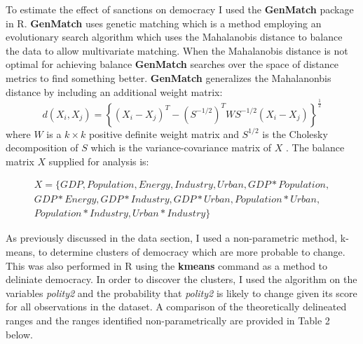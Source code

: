 \documentclass[a4paper]{article}\usepackage[]{graphicx}\usepackage[]{color}
\begin{document}
\par
To estimate the effect of sanctions on democracy I used the \textbf{GenMatch} package in R. \textbf{GenMatch} uses genetic matching which is a method employing an evolutionary search algorithm which uses the Mahalanobis distance to balance the data to allow multivariate matching\citep{diamond2013genetic}. When the Mahalanobis distance is not optimal for achieving balance \textbf{GenMatch} searches over the space of distance metrics to find something better. \textbf{GenMatch} generalizes the Mahalanonbis distance by including an additional weight matrix:
\[
d(X_i, X_j) = \left\{ (X_i - X_j)^{T} - (S^{-1/2})^{T} WS^{-1/2}(X_i - X_j)  \right\}^{\frac{1}{2}}
\]
where $W$ is a $k \times k$ positive definite weight matrix and $S^{1/2}$ is the Cholesky decomposition of $S$ which is the variance-covariance matrix of $X$ \citep[pg. 6]{diamond2013genetic}. The balance matrix $X$ supplied for analysis is:

\begin{equation*}
  \begin{aligned}
    X = \{GDP, Population, Energy, Industry, Urban, GDP*Population, \\
     GDP*Energy, GDP*Industry, GDP*Urban, Population*Urban, \\
     Population*Industry, Urban*Industry \}
  \end{aligned}
\end{equation*}

\par
As previously discussed in the data section, I used a non-parametric method, k-means, to determine clusters of democracy which are more probable to change. This was also performed in R using the \textbf{kmeans} command as a method to deliniate democracy. In order to discover the clusters, I used the algorithm on the variables \textit{polity2} and the probability that \textit{polity2} is likely to change given its score for all observations in the dataset. A comparison of the theoretically delineated ranges and the ranges identified non-parametrically are provided in Table 2 below. 
\par
\end{document}

